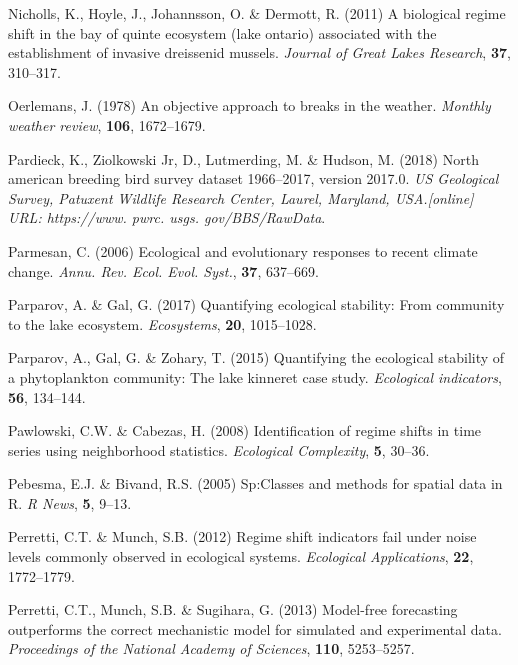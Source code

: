 \documentclass[12pt,twoside,openany]{reedthesis}
\begin{document}
\leavevmode\hypertarget{ref-nicholls2011biological}{}%
Nicholls, K., Hoyle, J., Johannsson, O. \& Dermott, R. (2011) A biological regime shift in the bay of quinte ecosystem (lake ontario) associated with the establishment of invasive dreissenid mussels. \emph{Journal of Great Lakes Research}, \textbf{37}, 310--317.

\leavevmode\hypertarget{ref-oerlemans1978objective}{}%
Oerlemans, J. (1978) An objective approach to breaks in the weather. \emph{Monthly weather review}, \textbf{106}, 1672--1679.

\leavevmode\hypertarget{ref-pardieck2018north}{}%
Pardieck, K., Ziolkowski Jr, D., Lutmerding, M. \& Hudson, M. (2018) North american breeding bird survey dataset 1966--2017, version 2017.0. \emph{US Geological Survey, Patuxent Wildlife Research Center, Laurel, Maryland, USA.{[}online{]} URL: https://www. pwrc. usgs. gov/BBS/RawData}.

\leavevmode\hypertarget{ref-parmesan_ecological_2006}{}%
Parmesan, C. (2006) Ecological and evolutionary responses to recent climate change. \emph{Annu. Rev. Ecol. Evol. Syst.}, \textbf{37}, 637--669.

\leavevmode\hypertarget{ref-parparov2017quantifying}{}%
Parparov, A. \& Gal, G. (2017) Quantifying ecological stability: From community to the lake ecosystem. \emph{Ecosystems}, \textbf{20}, 1015--1028.

\leavevmode\hypertarget{ref-parparov2015quantifying}{}%
Parparov, A., Gal, G. \& Zohary, T. (2015) Quantifying the ecological stability of a phytoplankton community: The lake kinneret case study. \emph{Ecological indicators}, \textbf{56}, 134--144.

\leavevmode\hypertarget{ref-pawlowski_identification_2008}{}%
Pawlowski, C.W. \& Cabezas, H. (2008) Identification of regime shifts in time series using neighborhood statistics. \emph{Ecological Complexity}, \textbf{5}, 30--36.

\leavevmode\hypertarget{ref-sp}{}%
Pebesma, E.J. \& Bivand, R.S. (2005) Sp:Classes and methods for spatial data in R. \emph{R News}, \textbf{5}, 9--13.

\leavevmode\hypertarget{ref-perretti2012regime}{}%
Perretti, C.T. \& Munch, S.B. (2012) Regime shift indicators fail under noise levels commonly observed in ecological systems. \emph{Ecological Applications}, \textbf{22}, 1772--1779.

\leavevmode\hypertarget{ref-perretti_model-free_2013}{}%
Perretti, C.T., Munch, S.B. \& Sugihara, G. (2013) Model-free forecasting outperforms the correct mechanistic model for simulated and experimental data. \emph{Proceedings of the National Academy of Sciences}, \textbf{110}, 5253--5257.
\end{document}
